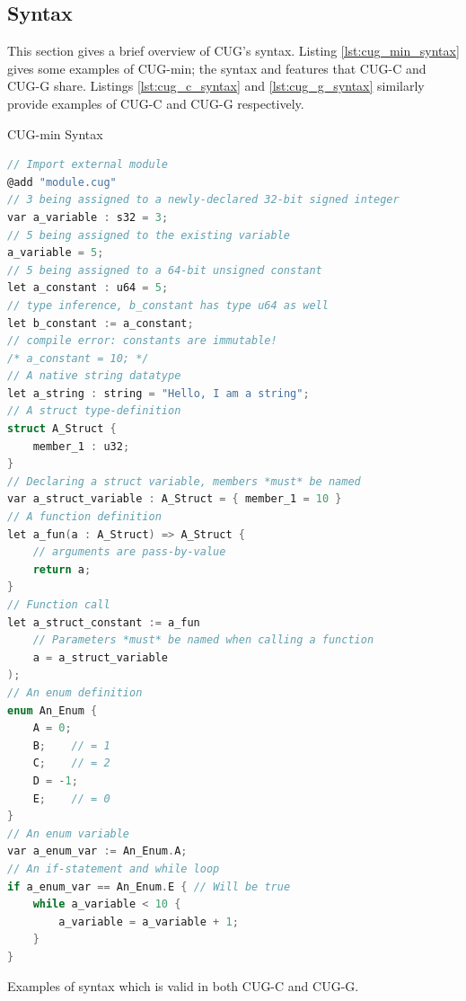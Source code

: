 \documentclass[a4paper,12pt,twoside,openright]{report}
\begin{document}
\subsection{Syntax}

\label{sec:language_syntax}

This section gives a brief overview of CUG's syntax. Listing
\ref{lst:cug_min_syntax} gives some examples of CUG-min; the syntax and
features that CUG-C and CUG-G share. Listings \ref{lst:cug_c_syntax} and
\ref{lst:cug_g_syntax} similarly provide examples of CUG-C and CUG-G
respectively.

\begin{lstfloat}
\begin{center} CUG-min Syntax \end{center}
\begin{lstlisting}[language=C]
// Import external module
@add "module.cug"
// 3 being assigned to a newly-declared 32-bit signed integer
var a_variable : s32 = 3;
// 5 being assigned to the existing variable
a_variable = 5;
// 5 being assigned to a 64-bit unsigned constant
let a_constant : u64 = 5;
// type inference, b_constant has type u64 as well
let b_constant := a_constant;
// compile error: constants are immutable!
/* a_constant = 10; */
// A native string datatype
let a_string : string = "Hello, I am a string";
// A struct type-definition
struct A_Struct {
    member_1 : u32;
}
// Declaring a struct variable, members *must* be named
var a_struct_variable : A_Struct = { member_1 = 10 }
// A function definition
let a_fun(a : A_Struct) => A_Struct {
    // arguments are pass-by-value
    return a;
}
// Function call
let a_struct_constant := a_fun
    // Parameters *must* be named when calling a function
    a = a_struct_variable
);
// An enum definition
enum An_Enum {
    A = 0;
    B;    // = 1
    C;    // = 2
    D = -1;
    E;    // = 0
}
// An enum variable
var a_enum_var := An_Enum.A;
// An if-statement and while loop
if a_enum_var == An_Enum.E { // Will be true
    while a_variable < 10 {
        a_variable = a_variable + 1;
    }
}
\end{lstlisting}
\caption{Examples of syntax which is valid in both CUG-C and CUG-G.}
\label{lst:cug_min_syntax}
\end{lstfloat}
\end{document}
